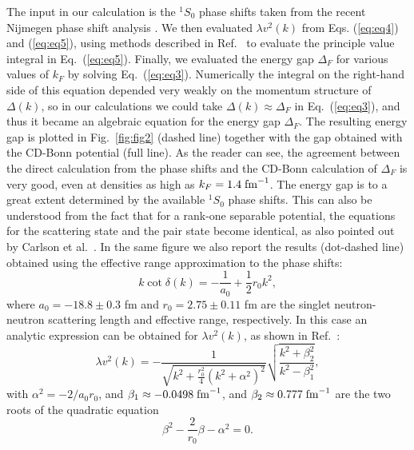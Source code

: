 \begin{multicols}{2}
The input in our calculation is the $^1S_0$ phase shifts taken from  
the recent Nijmegen phase shift analysis \cite{nijm93}. 
We then evaluated $\lambda v^2(k)$ from Eqs. (\ref{eq:eq4}) and 
(\ref{eq:eq5}), using methods described in Ref.\ \cite{davies91} to 
evaluate the principle value integral in Eq.\ (\ref{eq:eq5}). 
Finally, we evaluated the energy gap $\Delta_F$ for various values 
of $k_F$ by solving Eq.\ (\ref{eq:eq3}).  
Numerically the integral on the right-hand side of this equation 
depended very weakly on the momentum structure of $\Delta(k)$, so 
in our calculations we could take $\Delta(k)\approx \Delta_F$ in 
Eq.\ (\ref{eq:eq3}), and thus it became an algebraic equation 
for the energy gap $\Delta_F$.  
The resulting energy gap is plotted in Fig.\ 
\ref{fig:fig2} (dashed line) together with the gap obtained with the 
CD-Bonn potential (full line). 
As the reader can see, the agreement 
between the direct calculation from the phase shifts and the CD-Bonn 
calculation of $\Delta_F$ is very good, even 
at densities as high as $k_F=1.4\;{\rm fm}^{-1}$.  The energy gap 
is to a great extent determined by the available $^1S_0$ phase shifts.  
This can also be understood from the fact that for a rank-one separable
potential, the equations for the scattering state and the pair 
state become identical, as also pointed out by Carlson et al.\ 
\cite{carlson97}.
In the same figure we also report the results (dot-dashed line) 
obtained using the effective range approximation to the phase shifts: 
\begin{equation}
       k\cot \delta(k)=-\frac{1}{a_0}+\frac{1}{2}r_0 k^2,
       \label{eq:eq6}
\end{equation}
where $a_0=-18.8\pm 0.3$ fm and $r_0=2.75\pm 0.11$ fm are the singlet 
neutron-neutron scattering length and effective range, respectively.  
In this case an analytic expression can be obtained for $\lambda v^2(k)$, as 
shown in Ref.\ \cite{chadan92}:
\begin{equation}
       \lambda v^2(k)=-\frac{1}{\sqrt{k^2+
                       \frac{r_0^2}{4}(k^2+\alpha^2)^2}}
                       \sqrt{\frac{k^2+\beta_2^2}{k^2-\beta_1^2}},
       \label{eq:eq7}
\end{equation}
with $\alpha^2=-2/a_0 r_0$, and $\beta_1\approx-0.0498\;{\rm fm}^{-1}$, 
and $\beta_2\approx 0.777\;{\rm fm}^{-1}$ are the two roots of the 
quadratic equation 
\begin{equation}
   \beta^2-\frac{2}{r_0}\beta-\alpha^2=0.
   \label{eq:eq8}
\end{equation}  

\end{multicols}
